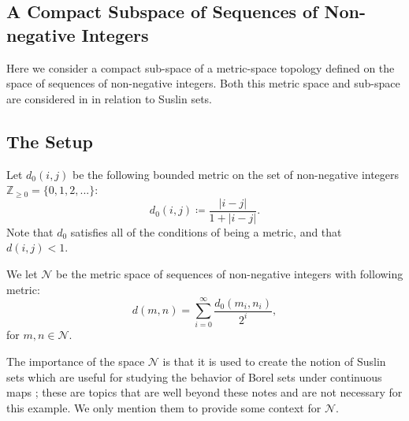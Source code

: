 \subsection{A Compact Subspace of Sequences of Non-negative Integers}

Here we consider a compact sub-space of a metric-space topology defined on the space of sequences of
non-negative integers. Both this metric space and sub-space are considered in \cite{federer} in relation to
Suslin sets. 

\subsection*{The Setup}

Let \(d_0(i, j)\) be the following bounded metric on the set of non-negative integers \(\mathbb Z_{\geq 0} = \{ 
0, 1, 2, ...\}\): 
\begin{equation}
d_0(i, j) \coloneqq \frac{|i -j|}{1 + |i - j|}.
\end{equation}
Note that \(d_0\) satisfies all of the conditions of being a metric, and that \(d(i, j) < 1\).

We let \(\mathcal N\) be the metric space of sequences of non-negative integers with following metric:
\begin{equation}
d(m, n) = \sum\limits_{i = 0}^\infty \frac{ d_0(m_i, n_i) } {2^i},
\end{equation}
for \(m, n \in \mathcal N\).

The importance of the space \(\mathcal N\) is that it is used to create the notion of Suslin sets which are
useful for studying the behavior of Borel sets under continuous maps \cite{federer}; these are topics
that are well beyond these notes and are not necessary for this example. We only mention them to provide
some context for \(\mathcal N\).


